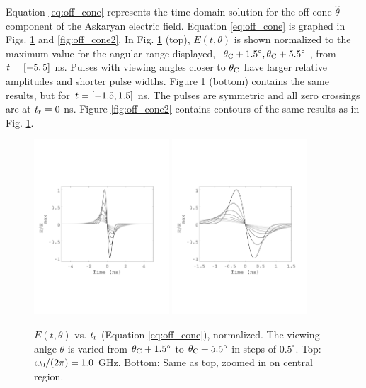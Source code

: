 \documentclass[amsmath,amssymb,aps,prd,10pt,twocolumn]{revtex4}
\begin{document}
Equation \ref{eq:off_cone} represents the time-domain solution for the off-cone $\hat{\theta}$-component of the Askaryan electric field.  Equation \ref{eq:off_cone} is graphed in Figs. \ref{fig:off_cone} and \ref{fig:off_cone2}. In Fig. \ref{fig:off_cone} (top),  $E(t,\theta)$ is shown normalized to the maximum value for the angular range displayed, $[\theta_{\rm C}+1.5^{\circ}, \theta_{\rm C}+5.5^{\circ}]$, from $t_{\rm} = [-5,5]$ ns.  Pulses with viewing angles closer to $\theta_{\rm C}$ have larger relative amplitudes and shorter pulse widths.  Figure \ref{fig:off_cone} (bottom) contains the same results, but for $t_{\rm} = [-1.5,1.5]$ ns.  The pulses are symmetric and all zero crossings are at $t_{\rm r} = 0$ ns.  Figure \ref{fig:off_cone2} contains contours of the same results as in Fig. \ref{fig:off_cone}.
\begin{figure}
\centering
\includegraphics[width=0.45\textwidth,trim=0cm 6cm 0cm 7cm,clip=true]{May5_plot1.pdf}
\includegraphics[width=0.45\textwidth,trim=0cm 6cm 0cm 7cm,clip=true]{May5_plot2.pdf}
\caption{\label{fig:off_cone} $E(t,\theta)$ vs. $t_{\rm r}$ (Equation \ref{eq:off_cone}), normalized.  The viewing anlge $\theta$ is varied from $\theta_{\rm C}+1.5^{\circ}$ to $\theta_{\rm C}+5.5^{\circ}$ in steps of $0.5^{\circ}$.  Top: $\omega_{\rm 0}/(2\pi) = 1.0$ GHz.  Bottom: Same as top, zoomed in on central region.}
\end{figure}
\end{document}
